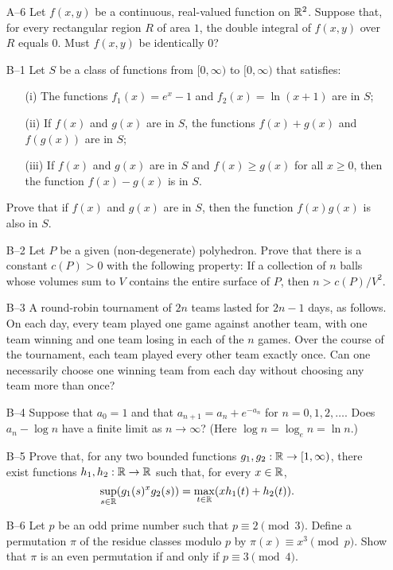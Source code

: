\documentclass[amssymb,twocolumn,pra,10pt,aps]{revtex4-1}
\begin{document}
\begin{itemize}
\item[A--6]
Let $f(x,y)$ be a continuous, real-valued function on $\mathbb{R}^2$. Suppose that, for every
rectangular region $R$ of area $1$, the double integral of $f(x,y)$ over $R$ equals $0$.
Must $f(x,y)$ be identically 0?

\item[B--1]
Let $S$ be a class of functions from $[0, \infty)$ to $[0, \infty)$ that satisfies:
\begin{itemize}
\item[(i)]
The functions $f_1(x) = e^x - 1$ and $f_2(x) = \ln(x+1)$ are in $S$;
\item[(ii)]
If $f(x)$ and $g(x)$ are in $S$, the functions $f(x) + g(x)$ and $f(g(x))$ are in $S$;
\item[(iii)]
If $f(x)$ and $g(x)$ are in $S$ and $f(x) \geq g(x)$ for all $x \geq 0$, then the function
$f(x) - g(x)$ is in $S$.
\end{itemize}
Prove that if $f(x)$ and $g(x)$ are in $S$, then the function $f(x) g(x)$ is also in $S$.

\item[B--2]
Let $P$ be a given (non-degenerate) polyhedron. Prove that there is a constant $c(P) > 0$
with the following property: If a collection of $n$ balls whose volumes sum to $V$ contains
the entire surface of $P$, then $n > c(P) / V^2$.

\item[B--3]
A round-robin tournament of $2n$ teams lasted for $2n-1$ days, as follows.
On each day, every team played one game against another team, with one team winning
and one team losing in each of the $n$ games. Over the course of the tournament,
each team played every other team exactly once. Can one necessarily choose
one winning team from each day without choosing any team more than once?

\item[B--4]
Suppose that $a_0 = 1$ and that $a_{n+1} = a_n + e^{-a_n}$ for $n=0,1,2,\dots$. Does $a_n - \log n$
have a finite limit as $n \to \infty$? (Here $\log n = \log_e n = \ln n$.)

\item[B--5]
Prove that, for any two bounded functions $g_1, g_2: \mathbb{R} \to [1, \infty)$,
there exist functions $h_1, h_2: \mathbb{R} \to \mathbb{R}$ such that, for every $x \in \mathbb{R}$,
\[
\sup_{s \in \mathbb{R}} (g_1(s)^x g_2(s))  = \max_{t \in \mathbb{R}} (x h_1(t) + h_2(t)).
\]

\item[B--6]
Let $p$ be an odd prime number such that $p \equiv 2 \pmod{3}$. Define a permutation $\pi$ of the
residue classes modulo $p$ by $\pi(x) \equiv x^3 \pmod{p}$. Show that $\pi$ is an even permutation
if and only if $p \equiv 3 \pmod{4}$.

\end{itemize}
\end{document}
